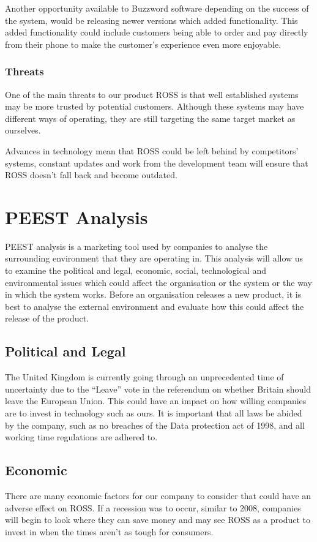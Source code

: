 \documentclass[11pt, oneside, a4paper]{report}   %
\begin{document}
\begin{flushleft}
Another opportunity available to Buzzword software depending on the success of the system, would be releasing newer versions which added functionality. This added functionality could include customers being able to order and pay directly from their phone to make the customer’s experience even more enjoyable.

\subsubsection{Threats}
One of the main threats to our product ROSS is that well established systems may be more trusted by potential customers. Although these systems may have different ways of operating, they are still targeting the same target market as ourselves. 

Advances in technology mean that ROSS could be left behind by competitors’ systems, constant updates and work from the development team will ensure that ROSS doesn’t fall back and become outdated.

\newpage
\section{PEEST Analysis}
PEEST analysis is a marketing tool used by companies to analyse the surrounding environment that they are operating in. This analysis will allow us to examine the political and legal, economic, social, technological and environmental issues which could affect the organisation or the system or the way in which the system works. Before an organisation releases a new product, it is best to analyse the external environment and evaluate how this could affect the release of the product.
\subsection{Political and Legal}
The United Kingdom is currently going through an unprecedented time of uncertainty due to the “Leave” vote in the referendum on whether Britain should leave the European Union. This could have an impact on how willing companies are to invest in technology such as ours. It is important that all laws be abided by the company, such as no breaches of the Data protection act of 1998, and all working time regulations are adhered to.
\subsection{Economic}
There are many economic factors for our company to consider that could have an adverse effect on ROSS. If a recession was to occur, similar to 2008, companies will begin to look where they can save money and may see ROSS as a product to invest in when the times aren’t as tough for consumers. 

\end{flushleft}
\end{document}
